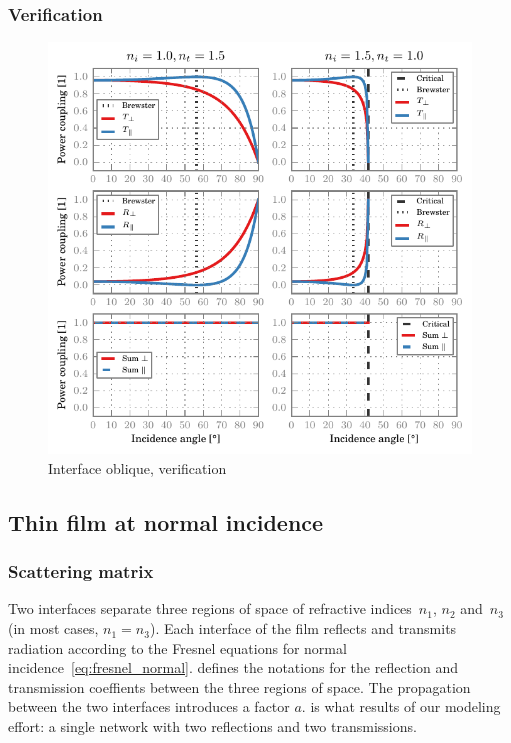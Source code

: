 \subsubsection{Verification}


\begin{figure}[hbtp]
    \centering
    \includegraphics{interface_oblique_verification}
    \caption{Interface oblique, verification}
    \label{fig:interface_oblique_verification}
\end{figure}


\subsection{Thin film at normal incidence}
\label{sec:thin_film_at_normal_incidence}

\subsubsection{Scattering matrix}

Two interfaces separate three regions of space of refractive indices~$n_1$, $n_2$ and~$n_3$ (in most cases, $n_1=n_3$).
Each interface of the film reflects and transmits radiation according to the Fresnel equations for normal incidence~\eqref{eq:fresnel_normal}.
 defines the notations for the reflection and transmission coeffients between the three regions of space.
The propagation between the two interfaces introduces a factor $a$.
 is what results of our modeling effort: a single network with two reflections and two transmissions.

